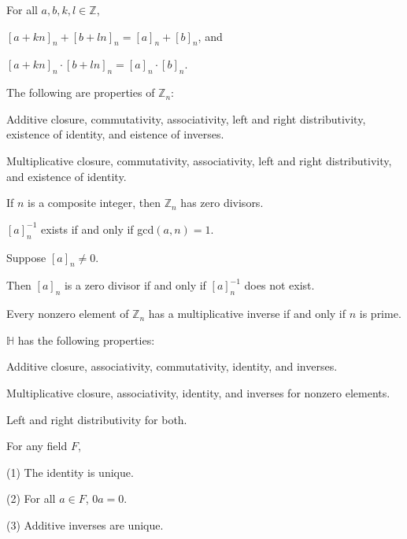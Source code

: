 \documentclass{article}
\newcommand{\Z}{\mathbb Z}
\newcommand{\quat}{\mathbb H}
\begin{document}

    For all $a, b, k, l \in \Z$,
    
    $[a + kn]_n + [b + ln]_n = [a]_n + [b]_n$, and
    
    $[a+kn]_n \cdot [b + ln]_n = [a]_n \cdot [b]_n$.
    

    The following are properties of $\Z_n$:
    
    Additive closure, commutativity, associativity, left and right distributivity, existence of identity, and eistence of inverses.
    
    Multiplicative closure, commutativity, associativity, left and right distributivity, and existence of identity.


    If $n$ is a composite integer, then $\Z_n$ has zero divisors.
    

    $[a]_n^{-1}$ exists if and only if gcd$(a,n) = 1$.


    Suppose $[a]_n \neq 0$. 
    
    Then $[a]_n$ is a zero divisor if and only if $[a]_n^{-1}$ does not exist.
    

    Every nonzero element of $\Z_n$ has a multiplicative inverse if and only if $n$ is prime.


    $\quat$ has the following properties:
    
    Additive closure, associativity, commutativity, identity, and inverses.
    
    Multiplicative closure, associativity, identity, and inverses for nonzero elements.
    
    Left and right distributivity for both.
    
\newpage
    
    
    For any field $F$,
    
    \indent\indent (1) The identity is unique.
    
    \indent\indent (2) For all $a\in F$, $0a = 0$.
    
    \indent\indent (3) Additive inverses are unique.
    
\end{document}
